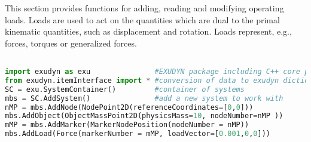\label{sec:mainsystem:load}



This section provides functions for adding, reading and modifying operating loads. Loads are used to act on the quantities which are dual to the primal kinematic quantities, such as displacement and rotation. Loads represent, e.g., forces, torques or generalized forces.
\pythonstyle
\begin{lstlisting}[language=Python, firstnumber=1]

import exudyn as exu               #EXUDYN package including C++ core part
from exudyn.itemInterface import * #conversion of data to exudyn dictionaries
SC = exu.SystemContainer()         #container of systems
mbs = SC.AddSystem()               #add a new system to work with
nMP = mbs.AddNode(NodePoint2D(referenceCoordinates=[0,0]))
mbs.AddObject(ObjectMassPoint2D(physicsMass=10, nodeNumber=nMP ))
mMP = mbs.AddMarker(MarkerNodePosition(nodeNumber = nMP))
mbs.AddLoad(Force(markerNumber = mMP, loadVector=[0.001,0,0]))
\end{lstlisting}

